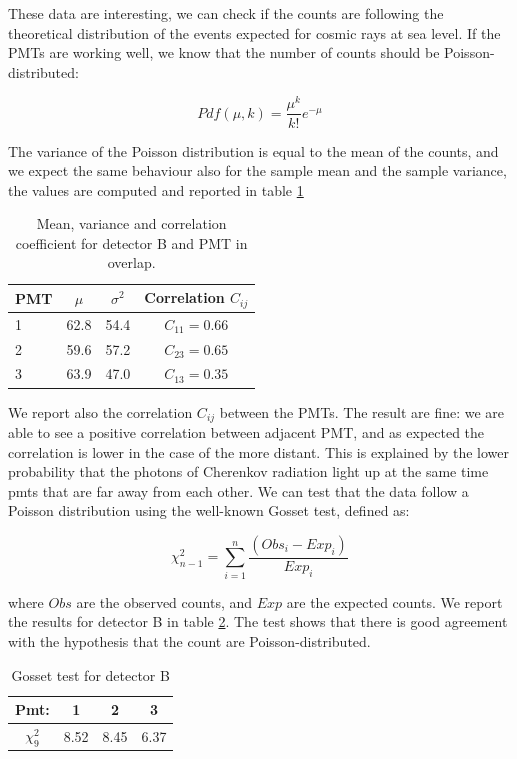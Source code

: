 These data are interesting, we can check if the counts are following the theoretical distribution of the events expected for cosmic rays at sea level. If the PMTs are working well, we know that the number of counts should be Poisson-distributed:

\begin{equation}
Pdf(\mu,k) =  \frac{\mu^{k}}{k!} e^{-\mu}
\end{equation}

The variance of the Poisson distribution is equal to the mean of the counts, and we expect the same behaviour also for the sample mean and the sample variance, the values are computed and reported in table \ref{tab:Bcounts}

\begin{table}[ht]
\centering
\begin{tabular}{l|c|c|c}
\hline 
PMT & $\mu$ & $\sigma^{2}$ & Correlation $C_{ij}$ \\
\hline
1 	& 62.8	& 54.4	& $C_{11} = 0.66$\\
2 	& 59.6	& 57.2	& $C_{23} = 0.65$\\
3	& 63.9	& 47.0  & $C_{13} = 0.35$\\
\hline
\end{tabular}
\caption{Mean, variance and correlation coefficient for detector B and PMT in overlap.}
\label{tab:Bcounts}
\end{table}

We report also the correlation $C_{ij}$ between the PMTs. The result are fine: we are able to see a positive correlation between adjacent PMT, and as expected the correlation is lower in the case of the more distant. This is explained by the lower probability that the photons of Cherenkov radiation light up at the same time pmts that are far away from each other.
We can test that the data follow a Poisson distribution using the well-known Gosset test, defined as:

\begin{equation}
\chi^{2}_{n-1} = \sum_{i = 1}^{n} \dfrac{(Obs_{i} - Exp_{i})}{Exp_{i}}
\end{equation}

where $Obs$ are the observed counts, and $Exp$ are the expected counts.
We report the results for detector B in table \ref{tab:GossetB}. The test shows that there is good agreement with the hypothesis that the count are Poisson-distributed.

\begingroup
\setlength{\tabcolsep}{8pt} %
\renewcommand{\arraystretch}{1.2} %
\begin{table}[htb]
\centering
\begin{tabular}{c|c|c|c}
\hline 
Pmt: & 1 & 2 & 3 \\ 
\hline
$\chi^{2}_{9}$ & 8.52 & 8.45 & 6.37 \\ 
\hline
\end{tabular}
\caption{Gosset test for detector B}
\label{tab:GossetB} 
\end{table}
\endgroup

